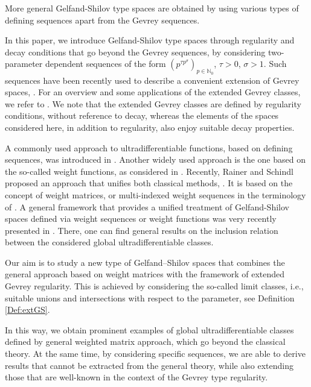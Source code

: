 \documentclass{article}
\theoremstyle{thmstyleone}
\theoremstyle{thmstyletwo}%
\theoremstyle{thmstylethree}%
\begin{document}
More general Gelfand-Shilov type spaces  are obtained by using various types of defining sequences
apart from the Gevrey sequences.

In this paper, we introduce Gelfand-Shilov type spaces through regularity and decay conditions that
go beyond the Gevrey sequences, by considering two-parameter dependent sequences of the form
$(p^{\tau p^{\sigma} })_{p \in \mathbb{N}_0 }$, $\tau > 0$, $\sigma > 1$. 
Such sequences have  been recently used to describe a convenient extension of Gevrey spaces, 
\cite{Garrido-2,PTT-01,PTT-03}. 
For an overview and some applications of the extended Gevrey classes, we refer to \cite{TTZ2024}. 
We note that the extended Gevrey classes are defined by regularity conditions, without reference to decay, whereas the elements of the spaces considered here, in addition to regularity, also enjoy suitable decay properties.


A commonly used approach to  ultradifferentiable functions, based on  defining sequences,
was introduced in \cite{Komatsuultra1}. Another widely used approach is the one based on the so-called weight functions,
as considered in  \cite{BMT}. Recently, Rainer and Schindl proposed an approach that unifies both classical methods, \cite{RS}. It is based on the concept of weight matrices, or multi-indexed weight sequences in the terminology of \cite{DNV2021}. A general framework that provides a unified treatment of Gelfand-Shilov spaces defined via weight sequences or weight functions was very recently presented in  \cite{BJOS,DNV2024}. There, one can find general results on the inclusion relation between the considered global ultradifferentiable classes.

Our aim is to study a new type of Gelfand–Shilov spaces that combines the general approach based on weight matrices with the framework of extended Gevrey regularity. This is achieved by considering the so-called limit classes, i.e., suitable unions and intersections with respect to the parameter, see Definition \ref{Def:extGS}.

In this way, we obtain prominent examples of global ultradifferentiable classes defined by general weighted matrix approach, which go beyond the classical theory.
At the same time, by considering specific sequences, we are able to derive results that cannot be extracted from the general theory,
while also extending those  that are well-known in the context  of the Gevrey type regularity.
\end{document}
